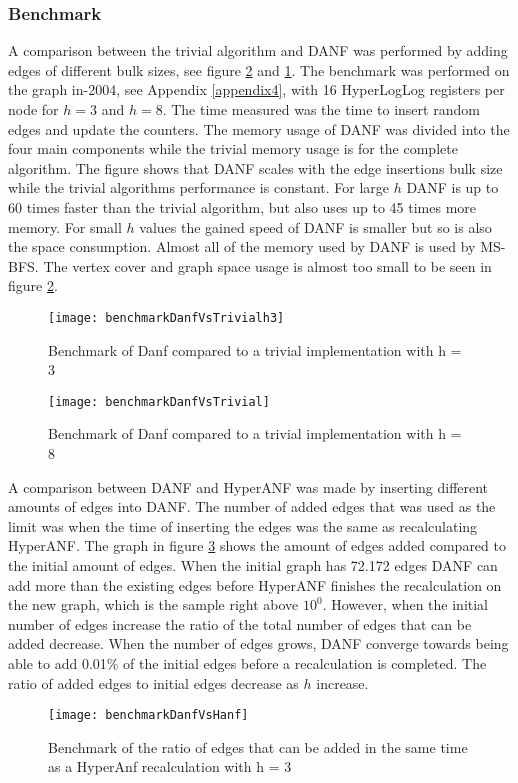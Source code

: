 \subsubsection{Benchmark}
A comparison between the trivial algorithm and DANF was performed by adding edges of different bulk sizes, see figure \ref{fig:benchmarkDanfVsTrivial} and \ref{fig:benchmarkDanfVsTrivialh3}. The benchmark was performed on the graph in-2004, see Appendix \ref{appendix4}, with 16 HyperLogLog registers per node for $h = 3$ and $h = 8$. The time measured was the time to insert random edges and update the counters. The memory usage of DANF was divided into the four main components while the trivial memory usage is for the complete algorithm. The figure shows that DANF scales with the edge insertions bulk size while the trivial algorithms performance is constant. For large $h$ DANF is up to 60 times faster than the trivial algorithm, but also uses up to 45 times more memory. For small $h$ values the gained speed of DANF is smaller but so is also the space consumption. Almost all of the memory used by DANF is used by MS-BFS. The vertex cover and graph space usage is almost too small to be seen in figure \ref{fig:benchmarkDanfVsTrivial}. 

\begin{figure}[h]
\centering
\texttt{[image: benchmarkDanfVsTrivialh3]}    
\captionsetup{justification=centering}
\caption {Benchmark of Danf compared to a trivial implementation with h = 3}
\label{fig:benchmarkDanfVsTrivialh3}
\end{figure}

\begin{figure}[h]
\centering
\texttt{[image: benchmarkDanfVsTrivial]}    
\captionsetup{justification=centering}
\caption {Benchmark of Danf compared to a trivial implementation with h = 8}
\label{fig:benchmarkDanfVsTrivial}
\end{figure}

A comparison between DANF and HyperANF was made by inserting different amounts of edges into DANF. The number of added edges that was used as the limit was when the time of inserting the edges was the same as recalculating HyperANF. The graph in figure \ref{fig:benchmarkDanfVsHanf} shows the amount of edges added compared to the initial amount of edges. When the initial graph has 72.172 edges DANF can add more than the existing edges before HyperANF finishes the recalculation on the new graph, which is the sample right above $10^0$. However, when the initial number of edges increase the ratio of the total number of edges that can be added decrease. When the number of edges grows, DANF converge towards being able to add 0.01\% of the initial edges before a recalculation is completed. The ratio of added edges to initial edges decrease as $h$ increase.

\begin{figure}[h]
\centering
\texttt{[image: benchmarkDanfVsHanf]}    
\captionsetup{justification=centering}
\caption {Benchmark of the ratio of edges that can be added in the same time as a HyperAnf recalculation with h = 3}
\label{fig:benchmarkDanfVsHanf}
\end{figure}






